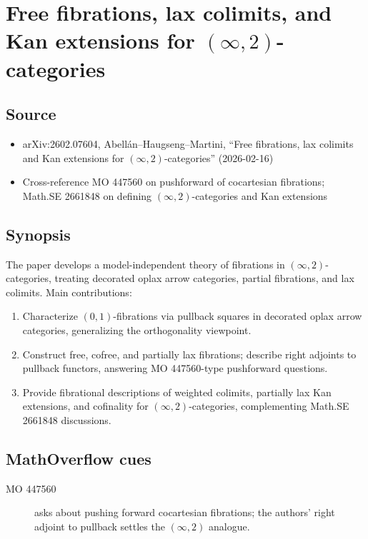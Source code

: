 \section*{Free fibrations, lax colimits, and Kan extensions for $(\infty,2)$-categories}
\subsection*{Source}
\begin{itemize}
  \item arXiv:2602.07604, Abell\'an--Haugseng--Martini, ``Free fibrations, lax colimits and Kan extensions for $(\infty,2)$-categories'' (2026-02-16)
  \item Cross-reference MO 447560 on pushforward of cocartesian fibrations; Math.SE 2661848 on defining $(\infty,2)$-categories and Kan extensions
\end{itemize}
\subsection*{Synopsis}
The paper develops a model-independent theory of fibrations in $(\infty,2)$-categories, treating decorated oplax arrow categories, partial fibrations, and lax colimits. Main contributions:
\begin{enumerate}
  \item Characterize $(0,1)$-fibrations via pullback squares in decorated oplax arrow categories, generalizing the orthogonality viewpoint.
  \item Construct free, cofree, and partially lax fibrations; describe right adjoints to pullback functors, answering MO 447560-type pushforward questions.
  \item Provide fibrational descriptions of weighted colimits, partially lax Kan extensions, and cofinality for $(\infty,2)$-categories, complementing Math.SE 2661848 discussions.
\end{enumerate}
\subsection*{MathOverflow cues}
\begin{description}
  \item[MO 447560] asks about pushing forward cocartesian fibrations; the authors’ right adjoint to pullback settles the $(\infty,2)$ analogue.
\end{description}
